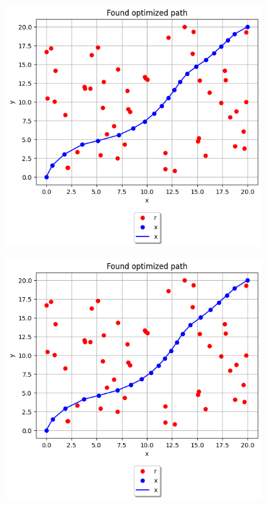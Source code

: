 \documentclass{article}
\begin{document}
\begin{figure}[H]
  \includegraphics[width=\linewidth]{figures/3.png}
\end{figure}

\begin{figure}[H]
  \includegraphics[width=\linewidth]{figures/4.png}
\end{figure}
\end{document}
